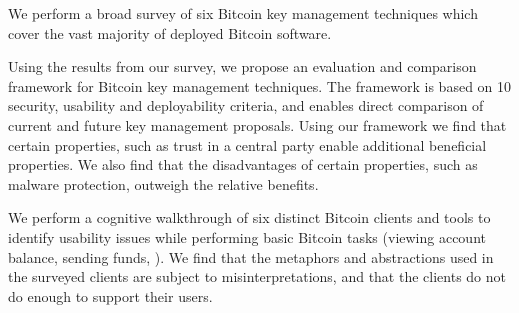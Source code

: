 \begin{compactlist}
\item We perform a broad survey of six Bitcoin key management techniques which cover the vast majority of deployed Bitcoin software. 

\item Using the results from our survey, we propose an evaluation and comparison framework for Bitcoin key management techniques. The framework is based on 10 security, usability and deployability criteria, and enables direct comparison of current and future key management proposals. Using our framework we find that certain properties, such as trust in a central party enable additional beneficial properties. We also find that the disadvantages of certain properties, such as malware protection, outweigh the relative benefits.

\item We perform a cognitive walkthrough of six distinct Bitcoin clients and tools to identify usability issues while performing basic Bitcoin tasks (\eg viewing account balance, sending funds, \etc). We find that the metaphors and abstractions used in the surveyed clients are subject to misinterpretations, and that the clients do not do enough to support their users.

\end{compactlist}



